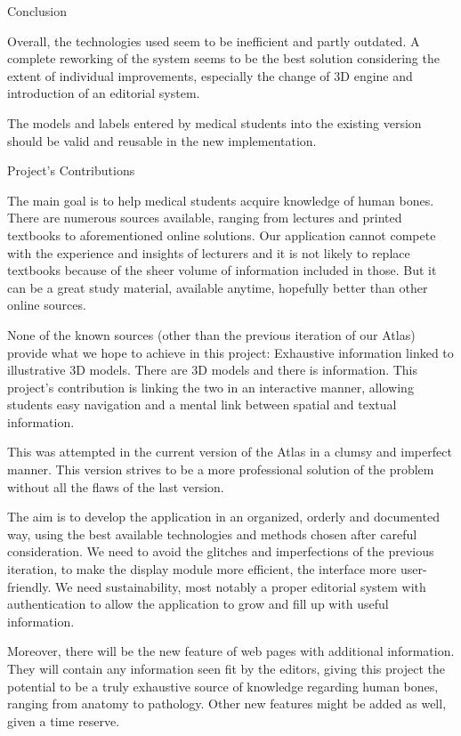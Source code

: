 \secc Conclusion

Overall, the technologies used seem to be inefficient and partly outdated. A complete reworking of the system seems to be the best solution considering the extent of individual improvements, especially the change of 3D engine and introduction of an editorial system.

The models and labels entered by medical students into the existing version should be valid and reusable in the new implementation.

\sec Project's Contributions

The main goal is to help medical students acquire knowledge of human bones. There are numerous sources available, ranging from lectures and printed textbooks to aforementioned online solutions. Our application cannot compete with the experience and insights of lecturers and it is not likely to replace textbooks because of the sheer volume of information included in those. But it can be a great study material, available anytime, hopefully better than other online sources.

None of the known sources (other than the previous iteration of our Atlas) provide what we hope to achieve in this project: Exhaustive information linked to illustrative 3D models. There are 3D models and there is information. This project’s contribution is linking the two in an interactive manner, allowing students easy navigation and a mental link between spatial and textual information.

This was attempted in the current version of the Atlas in a clumsy and imperfect manner. This version strives to be a more professional solution of the problem without all the flaws of the last version.

The aim is to develop the application in an organized, orderly and documented way, using the best available technologies and methods chosen after careful consideration. We need to avoid the glitches and imperfections of the previous iteration, to make the display module more efficient, the interface more user-friendly. We need sustainability, most notably a proper editorial system with authentication to allow the application to grow and fill up with useful information.

Moreover, there will be the new feature of web pages with additional information. They will contain any information seen fit by the editors, giving this project the potential to be a truly exhaustive source of knowledge regarding human bones, ranging from anatomy to pathology. Other new features might be added as well, given a time reserve.